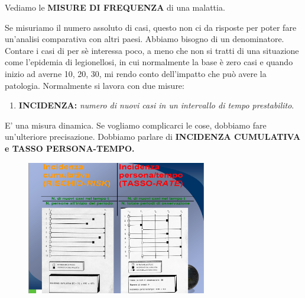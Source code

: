 Vediamo le \textbf{MISURE DI FREQUENZA} di una malattia.

Se misuriamo il numero assoluto di casi, questo non ci da risposte per
poter fare un'analisi comparativa con altri paesi. Abbiamo bisogno di un
denominatore. Contare i casi di per sè interessa poco, a meno che non si
tratti di una situazione come l'epidemia di legionellosi, in cui
normalmente la base è zero casi e quando inizio ad averne 10, 20, 30, mi
rendo conto dell'impatto che può avere la patologia. Normalmente si
lavora con due misure:

\begin{enumerate}
\def\labelenumi{\arabic{enumi}.}
\item
  \textbf{INCIDENZA:} \emph{numero di nuovi casi in un intervallo di
  tempo prestabilito}.
\end{enumerate}

E' una misura dinamica. Se vogliamo complicarci le cose, dobbiamo fare
un'ulteriore precisazione. Dobbiamo parlare di \textbf{INCIDENZA
CUMULATIVA e TASSO PERSONA-TEMPO.}
\begin{figure}[!ht]
\centering
	\includegraphics[width=0.7\textwidth]{03/image5.png}
\end{figure}

